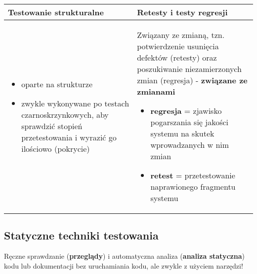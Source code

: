 \documentclass[../main.tex]{subfiles}
\begin{document}
    \begin{table}[H]
        \begin{center}
            \begin{tabular}{| p{8cm}| p{8cm}|}
                \hline
                \textbf{Testowanie strukturalne} & \textbf{Retesty i testy regresji}\\
                \hline
                \begin{itemize}
                    \item oparte na strukturze
                    \item zwykle wykonywane po testach czarnoskrzynkowych, aby sprawdzić stopień przetestowania i wyrazić go
                    ilościowo (pokrycie)
                \end{itemize}
                &
                Związany ze zmianą, tzn. potwierdzenie usunięcia defektów
                (retesty) oraz poszukiwanie niezamierzonych zmian (regresja) - \textbf{związane ze zmianami}
                \begin{itemize}
                    \item \textbf{regresja} = zjawisko pogarszania się jakości systemu na skutek
                    wprowadzanych w nim zmian
                    \item \textbf{retest} = przetestowanie naprawionego fragmentu systemu
                \end{itemize}\\

                \hline
            \end{tabular}
        \end{center}
    \end{table}


    \subsection{Statyczne techniki testowania}
    Ręczne sprawdzanie (\textbf{przeglądy}) i automatyczna analiza (\textbf{analiza statyczna}) kodu lub dokumentacji
    bez uruchamiania kodu, ale zwykle z użyciem narzędzi!
\end{document}
